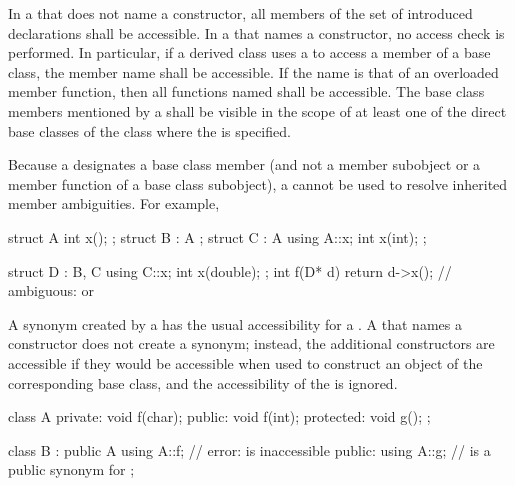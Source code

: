 \pnum
{}%
In a  that does not name a constructor,
all members of the set of introduced declarations shall be accessible.
In a  that names a constructor,
no access check is performed.
In particular, if a derived class uses a
 to access a member of a base class, the
member name shall be accessible. If the name is that of an overloaded
member function, then all functions named shall be accessible. The base
class members mentioned by a  shall be
visible in the scope of at least one of the direct base classes of the
class where the  is specified. \begin{note}
Because a  designates a base class member
(and not a member subobject or a member function of a base class
subobject), a  cannot be used to resolve
inherited member ambiguities. For example,

\begin{codeblock}
struct A { int x(); };
struct B : A { };
struct C : A {
  using A::x;
  int x(int);
};

struct D : B, C {
  using C::x;
  int x(double);
};
int f(D* d) {
  return d->x();    // ambiguous:  or 
}
\end{codeblock}
\end{note}

\pnum
A synonym created by a  has the usual
accessibility for a .
A  that names a constructor does not
create a synonym; instead, the additional constructors
are accessible if they would be accessible
when used to construct an object of the corresponding base class,
and the accessibility of the  is ignored.
\begin{example}

\begin{codeblock}
class A {
private:
    void f(char);
public:
    void f(int);
protected:
    void g();
};

class B : public A {
  using A::f;       // error:  is inaccessible
public:
  using A::g;       //  is a public synonym for 
};
\end{codeblock}
\end{example}

